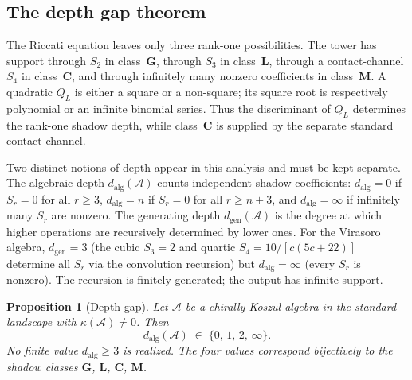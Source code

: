 \documentclass[11pt]{article}
\theoremstyle{plain}
\newtheorem{proposition}[theorem]{Proposition}
\theoremstyle{definition}
\theoremstyle{remark}
\providecommand{\cA}{\mathcal{A}}
\begin{document}
\subsection{The depth gap theorem}\label{ssec:depth-gap}

The Riccati equation leaves only three rank-one possibilities. The
tower has support through $S_2$ in class~$\mathbf{G}$, through $S_3$
in class~$\mathbf{L}$, through a contact-channel $S_4$ in
class~$\mathbf{C}$, and through infinitely many nonzero coefficients
in class~$\mathbf{M}$. A quadratic $Q_L$ is either a square or a
non-square; its square root is respectively polynomial or an infinite
binomial series. Thus the discriminant of $Q_L$ determines the
rank-one shadow depth, while class~$\mathbf{C}$ is supplied by the
separate standard contact channel.

Two distinct notions of depth appear in this analysis and must
be kept separate. The algebraic depth
$d_{\mathrm{alg}}(\cA)$ counts independent shadow coefficients:
$d_{\mathrm{alg}} = 0$ if $S_r = 0$ for all $r \geq 3$,
$d_{\mathrm{alg}} = n$ if $S_r = 0$ for all $r \geq n + 3$,
and $d_{\mathrm{alg}} = \infty$ if infinitely many $S_r$ are
nonzero. The generating depth $d_{\mathrm{gen}}(\cA)$ is the
degree at which higher operations are recursively determined by
lower ones. For the Virasoro algebra, $d_{\mathrm{gen}} = 3$
(the cubic $S_3 = 2$ and quartic $S_4 = 10/[c(5c{+}22)]$
determine all $S_r$ via the convolution recursion) but
$d_{\mathrm{alg}} = \infty$ (every $S_r$ is nonzero). The
recursion is finitely generated; the output has infinite support.

\begin{proposition}[Depth gap]\label{prop:depth-gap-standalone}
Let $\cA$ be a chirally Koszul algebra in the standard landscape
with $\kappa(\cA) \neq 0$. Then
\[
 d_{\mathrm{alg}}(\cA) \;\in\; \{0,\, 1,\, 2,\, \infty\}.
\]
No finite value $d_{\mathrm{alg}} \geq 3$ is realized.
The four values correspond bijectively to the shadow classes
$\mathbf{G}$, $\mathbf{L}$, $\mathbf{C}$, $\mathbf{M}$.
\end{proposition}
\end{document}
